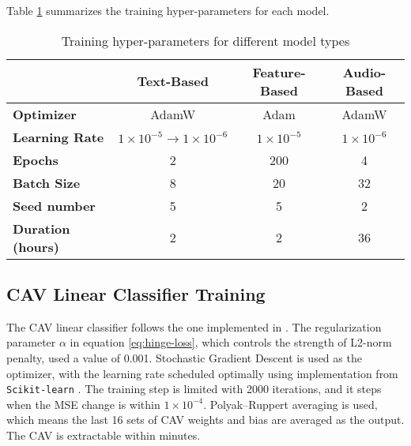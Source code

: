 Table \ref{tab:training_hyper_param} summarizes the training hyper-parameters for each model.

\begin{table}[H]
    \centering
    \begin{tabular}{|l|c|c|c|}
        \hline
                                  & \textbf{Text-Based}                             & \textbf{Feature-Based} & \textbf{Audio-Based} \\
        \hline
        \textbf{Optimizer}        & AdamW                                           & Adam                   & AdamW                \\ \hline
        \textbf{Learning Rate}    & $1 \times 10^{-5} \rightarrow 1 \times 10^{-6}$ & $1 \times 10^{-5}$     & $1 \times 10^{-6}$   \\ \hline
        \textbf{Epochs}           & 2                                               & 200                    & 4                    \\ \hline
        \textbf{Batch Size}       & 8                                               & 20                     & 32                   \\ \hline
        \textbf{Seed number}      & 5                                               & 5                      & 2                    \\ \hline
        \textbf{Duration (hours)} & 2                                               & 2                      & 36                   \\ \hline
    \end{tabular}
    \caption{Training hyper-parameters for different model types}
    \label{tab:training_hyper_param}
\end{table}

\subsection{CAV Linear Classifier Training}
The CAV linear classifier follows the one implemented in \cite{feature_bias}. The regularization parameter $\alpha$ in equation \ref{eq:hinge-loss}, which controls the strength of L2-norm penalty, used a value of 0.001. Stochastic Gradient Descent is used as the optimizer, with the learning rate scheduled optimally using implementation from \verb|Scikit-learn| \cite{scikit-learn}. The training step is limited with 2000 iterations, and it steps when the MSE change is within $1 \times 10^{-4}$. Polyak–Ruppert averaging is used, which means the last 16 sets of CAV weights and bias are averaged as the output. The CAV is extractable within minutes.

